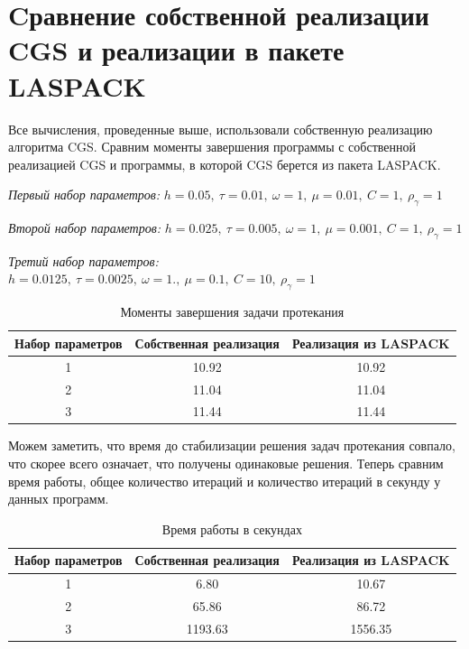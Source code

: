 \documentclass[specialist,subf,href,colorlinks=true,12pt
,times,mtpro,specialist
]{disser}
\begin{document}
\section {Cравнение собственной реализации CGS и реализации в пакете LASPACK}

Все вычисления, проведенные выше, использовали собственную реализацию алгоритма CGS. Сравним
моменты завершения программы с собственной реализацией CGS и программы, в которой CGS берется из пакета LASPACK.

\textit{Первый набор параметров:} $h = 0.05,\ \tau = 0.01,\ \omega = 1,\ \mu = 0.01,\ C = 1,\ \rho_\gamma = 1$

\textit{Второй набор параметров:} $h = 0.025,\ \tau = 0.005,\ \omega = 1,\ \mu = 0.001,\ C = 1,\ \rho_\gamma = 1$

\textit{Третий набор параметров:} $h = 0.0125,\ \tau = 0.0025,\ \omega = 1.,\ \mu = 0.1,\ C = 10,\ \rho_\gamma = 1$

\begin{table}[H]
\caption{Моменты завершения задачи протекания}
\begin{center}
\begin{tabular}{|c|c|c|}
\hline
Набор параметров & Собственная реализация & Реализация из LASPACK \\
\hline
1 & 10.92 & 10.92 \\
\hline
2 & 11.04 & 11.04 \\
\hline
3 & 11.44 & 11.44 \\
\hline
\end{tabular}
\end{center}
\end{table}

Можем заметить, что время до стабилизации решения задач протекания совпало, что скорее всего означает, что получены одинаковые решения. Теперь сравним время работы, общее количество итераций и количество итераций в секунду у данных программ.

\begin{table}[H]
\caption{Время работы в секундах}
\begin{center}
\begin{tabular}{|c|c|c|}
\hline
Набор параметров & Собственная реализация & Реализация из LASPACK \\
\hline
1 & 6.80 & 10.67  \\
\hline
2 & 65.86 & 86.72 \\
\hline
3 & 1193.63 & 1556.35 \\
\hline
\end{tabular}
\end{center}
\end{table}
\end{document}
